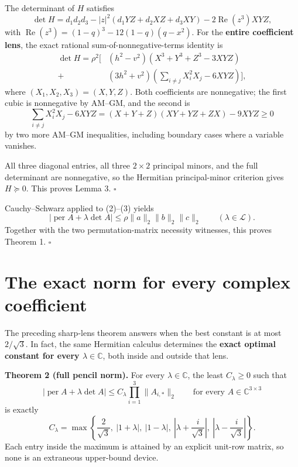 \documentclass[11pt]{article}
\begin{document}
The determinant of \(H\) satisfies \[
\det H=d_1d_2d_3-|z|^2(d_1YZ+d_2XZ+d_3XY)
-2\operatorname{Re}(z^3)XYZ,
\tag{8}
\] with \(\operatorname{Re}(z^3)=(1-q)^3-12(1-q)(q-x^2)\). For the
\textbf{entire coefficient lens}, the exact rational
sum-of-nonnegative-terms identity is \[
\boxed{
\begin{aligned}
\det H=\rho^2\bigg[
 &(h^2-v^2)\left(X^3+Y^3+Z^3-3XYZ\right)\\
+&(3h^2+v^2)\left(\sum_{i\ne j}X_i^2X_j-6XYZ\right)
\bigg],
\end{aligned}}
\tag{9}
\] where \((X_1,X_2,X_3)=(X,Y,Z)\). Both coefficients are nonnegative;
the first cubic is nonnegative by AM--GM, and the second is \[
\sum_{i\ne j}X_i^2X_j-6XYZ
=(X+Y+Z)(XY+YZ+ZX)-9XYZ\ge0
\tag{10}
\] by two more AM--GM inequalities, including boundary cases where a
variable vanishes.

All three diagonal entries, all three \(2\times2\) principal minors, and
the full determinant are nonnegative, so the Hermitian principal-minor
criterion gives \(H\succeq0\). This proves Lemma 3. \(\square\)

Cauchy--Schwarz applied to (2)--(3) yields \[
|\operatorname{per}A+\lambda\det A|
\le\rho\|a\|_2\|b\|_2\|c\|_2
\qquad(\lambda\in\mathcal L).
\tag{11}
\] Together with the two permutation-matrix necessity witnesses, this
proves Theorem 1. \(\square\)

\section{The exact norm for every complex
coefficient}\label{the-exact-norm-for-every-complex-coefficient}

The preceding sharp-lens theorem answers when the best constant is at
most \(2/\sqrt3\). In fact, the same Hermitian calculus determines the
\textbf{exact optimal constant for every \(\lambda\in\mathbb C\)}, both
inside and outside that lens.

\textbf{Theorem 2 (full pencil norm).} For every
\(\lambda\in\mathbb C\), the least \(C_\lambda\ge0\) such that \[
|\operatorname{per}A+\lambda\det A|
\le C_\lambda\prod_{i=1}^3\|A_{i,*}\|_2
\qquad\text{for every }A\in\mathbb C^{3\times3}
\tag{20}
\] is exactly \[
\boxed{
C_\lambda=\max\left\{
\frac2{\sqrt3},\ |1+\lambda|,\ |1-\lambda|,\
\left|\lambda+\frac{i}{\sqrt3}\right|,\
\left|\lambda-\frac{i}{\sqrt3}\right|
\right\}.}
\tag{21}
\] Each entry inside the maximum is attained by an explicit unit-row
matrix, so none is an extraneous upper-bound device.
\end{document}
